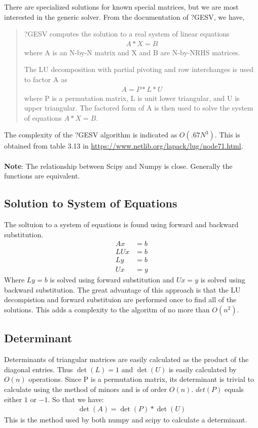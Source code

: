 \documentclass[12pt]{article}
\begin{document}
There are specialized solutions for known special matrices, but we are most interested in the generic solver. From the documentation of ?GESV, we have, 
\begin{quote}
?GESV computes the solution to a real system of linear equations
\begin{align*}
	A * X = B
\end{align*}
where A is an N-by-N matrix and X and B are N-by-NRHS matrices.

The LU decomposition with partial pivoting and row interchanges is
used to factor A as
\begin{align*}
	A = P * L * U
\end{align*}
where P is a permutation matrix, L is unit lower triangular, and U is
upper triangular.  The factored form of A is then used to solve the
system of equations $A * X = B$.
\end{quote}
The complexity of the ?GESV algorithm is indicated as $O(.67N^3)$. This is obtained from table 3.13 in \url{https://www.netlib.org/lapack/lug/node71.html}.
\\\\
\textbf{Note}: The relationship between Scipy and Numpy is close. Generally the functions are equivalent.

\subsection{Solution to System of Equations}
The soltuion to a system of equations is found using forward and backward substitution.
\begin{align*}
	Ax &= b \\
	LUx &= b \\
	Ly &= b \\
	Ux &=y
\end{align*}
Where $Ly=b$ is solved using forward substitution and $Ux=y$ is solved using backward substitution. The great advantage of this approach is that the LU decompistion and forward substituion are performed once to find all of the solutions. This adds a complexity to the algoritm of no more than $O(n^2)$.

\subsection{Determinant}
Determinants of triangular matrices are easily calculated as the product of the diagonal entries. Thus $\det(L) =1$ and $\det(U)$ is easily calculated by $O(n)$ operations. Since P is a permutation matrix, its determinant is trivial to calculate using the method of minors and is of order $O(n)$. $det(P)$ equals either $1$ or $-1$. So that we have:
\begin{align*}
	\det(A) = \det(P) * \det(U)
\end{align*}
This is the method used by both numpy and scipy to calculate a determinant.
\end{document}
